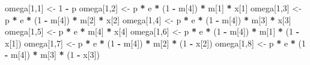 \documentclass[
  12pt,
]{krantz}
\newenvironment{Shaded}{\begin{snugshade}}{\end{snugshade}}
\newcommand{\DecValTok}[1]{\textcolor[rgb]{0.00,0.00,0.81}{#1}}
\newcommand{\NormalTok}[1]{#1}
\newcommand{\OtherTok}[1]{\textcolor[rgb]{0.56,0.35,0.01}{#1}}
\newcommand{\SpecialCharTok}[1]{\textcolor[rgb]{0.81,0.36,0.00}{\textbf{#1}}}
\begin{document}
\begin{Shaded}
\begin{Highlighting}[]
\NormalTok{omega[}\DecValTok{1}\NormalTok{,}\DecValTok{1}\NormalTok{] }\OtherTok{\textless{}{-}} \DecValTok{1} \SpecialCharTok{{-}}\NormalTok{ p                                  }
\NormalTok{omega[}\DecValTok{1}\NormalTok{,}\DecValTok{2}\NormalTok{] }\OtherTok{\textless{}{-}}\NormalTok{ p }\SpecialCharTok{*}\NormalTok{ e }\SpecialCharTok{*}\NormalTok{ (}\DecValTok{1} \SpecialCharTok{{-}}\NormalTok{ m[}\DecValTok{4}\NormalTok{]) }\SpecialCharTok{*}\NormalTok{ m[}\DecValTok{1}\NormalTok{] }\SpecialCharTok{*}\NormalTok{ x[}\DecValTok{1}\NormalTok{]      }
\NormalTok{omega[}\DecValTok{1}\NormalTok{,}\DecValTok{3}\NormalTok{] }\OtherTok{\textless{}{-}}\NormalTok{ p }\SpecialCharTok{*}\NormalTok{ e }\SpecialCharTok{*}\NormalTok{ (}\DecValTok{1} \SpecialCharTok{{-}}\NormalTok{ m[}\DecValTok{4}\NormalTok{]) }\SpecialCharTok{*}\NormalTok{ m[}\DecValTok{2}\NormalTok{] }\SpecialCharTok{*}\NormalTok{ x[}\DecValTok{2}\NormalTok{]      }
\NormalTok{omega[}\DecValTok{1}\NormalTok{,}\DecValTok{4}\NormalTok{] }\OtherTok{\textless{}{-}}\NormalTok{ p }\SpecialCharTok{*}\NormalTok{ e }\SpecialCharTok{*}\NormalTok{ (}\DecValTok{1} \SpecialCharTok{{-}}\NormalTok{ m[}\DecValTok{4}\NormalTok{]) }\SpecialCharTok{*}\NormalTok{ m[}\DecValTok{3}\NormalTok{] }\SpecialCharTok{*}\NormalTok{ x[}\DecValTok{3}\NormalTok{]      }
\NormalTok{omega[}\DecValTok{1}\NormalTok{,}\DecValTok{5}\NormalTok{] }\OtherTok{\textless{}{-}}\NormalTok{ p }\SpecialCharTok{*}\NormalTok{ e }\SpecialCharTok{*}\NormalTok{ m[}\DecValTok{4}\NormalTok{] }\SpecialCharTok{*}\NormalTok{ x[}\DecValTok{4}\NormalTok{]      }
\NormalTok{omega[}\DecValTok{1}\NormalTok{,}\DecValTok{6}\NormalTok{] }\OtherTok{\textless{}{-}}\NormalTok{ p }\SpecialCharTok{*}\NormalTok{ e }\SpecialCharTok{*}\NormalTok{ (}\DecValTok{1} \SpecialCharTok{{-}}\NormalTok{ m[}\DecValTok{4}\NormalTok{]) }\SpecialCharTok{*}\NormalTok{ m[}\DecValTok{1}\NormalTok{] }\SpecialCharTok{*}\NormalTok{ (}\DecValTok{1} \SpecialCharTok{{-}}\NormalTok{ x[}\DecValTok{1}\NormalTok{])      }
\NormalTok{omega[}\DecValTok{1}\NormalTok{,}\DecValTok{7}\NormalTok{] }\OtherTok{\textless{}{-}}\NormalTok{ p }\SpecialCharTok{*}\NormalTok{ e }\SpecialCharTok{*}\NormalTok{ (}\DecValTok{1} \SpecialCharTok{{-}}\NormalTok{ m[}\DecValTok{4}\NormalTok{]) }\SpecialCharTok{*}\NormalTok{ m[}\DecValTok{2}\NormalTok{] }\SpecialCharTok{*}\NormalTok{ (}\DecValTok{1} \SpecialCharTok{{-}}\NormalTok{ x[}\DecValTok{2}\NormalTok{])      }
\NormalTok{omega[}\DecValTok{1}\NormalTok{,}\DecValTok{8}\NormalTok{] }\OtherTok{\textless{}{-}}\NormalTok{ p }\SpecialCharTok{*}\NormalTok{ e }\SpecialCharTok{*}\NormalTok{ (}\DecValTok{1} \SpecialCharTok{{-}}\NormalTok{ m[}\DecValTok{4}\NormalTok{]) }\SpecialCharTok{*}\NormalTok{ m[}\DecValTok{3}\NormalTok{] }\SpecialCharTok{*}\NormalTok{ (}\DecValTok{1} \SpecialCharTok{{-}}\NormalTok{ x[}\DecValTok{3}\NormalTok{])      }

\end{Highlighting}
\end{Shaded}
\end{document}
